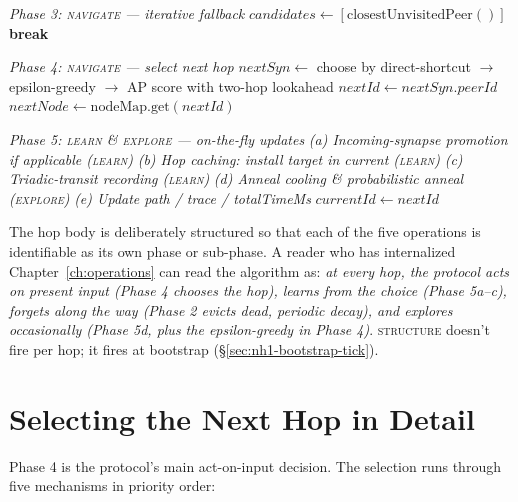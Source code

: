\documentclass[twoside,nobib]{tufte-book}
\begin{document}
\begin{algorithm}
\begin{algorithmic}[1]
\Statex \emph{Phase 3: \textsc{navigate} --- iterative fallback}
  \State $\mathit{candidates} \gets [\mathrm{closestUnvisitedPeer}()]$
   \textbf{break} \EndIf
\EndIf

\Statex \emph{Phase 4: \textsc{navigate} --- select next hop}
\State $\mathit{nextSyn} \gets$ choose by direct-shortcut
       $\to$ epsilon-greedy $\to$ AP score with two-hop lookahead
\State $\mathit{nextId} \gets \mathit{nextSyn}.\mathit{peerId}$
\State $\mathit{nextNode} \gets \mathrm{nodeMap.get}(\mathit{nextId})$

\Statex \emph{Phase 5: \textsc{learn} \& \textsc{explore} ---
       on-the-fly updates}
\State \emph{(a) Incoming-synapse promotion if applicable
            (\textsc{learn})}
\State \emph{(b) Hop caching: install target in current
            (\textsc{learn})}
\State \emph{(c) Triadic-transit recording (\textsc{learn})}
\State \emph{(d) Anneal cooling \& probabilistic anneal
            (\textsc{explore})}
\State \emph{(e) Update path / trace / totalTimeMs}
\State $\mathit{currentId} \gets \mathit{nextId}$
\end{algorithmic}
\end{algorithm}

The hop body is deliberately structured so that each of the five
operations is identifiable as its own phase or sub-phase. A
reader who has internalized Chapter~\ref{ch:operations} can read
the algorithm as: \emph{at every hop, the protocol acts on
present input (Phase 4 chooses the hop), learns from the
choice (Phase 5a–c), forgets along the way
(Phase 2 evicts dead, periodic decay), and explores
occasionally (Phase 5d, plus the epsilon-greedy in Phase 4)}.
\textsc{structure} doesn't fire per hop; it fires at bootstrap
(\S\ref{sec:nh1-bootstrap-tick}).

\section{Selecting the Next Hop in Detail}

Phase 4 is the protocol's main act-on-input decision. The
selection runs through five mechanisms in priority order:
\end{document}
